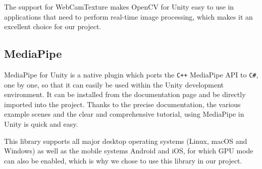 The support for WebCamTexture makes OpenCV for Unity easy to use in applications that need to perform real-time image processing,
which makes it an excellent choice for our project.

\subsection{MediaPipe}\label{subsec:mediapipe-for-unity}
MediaPipe for Unity is a native plugin which ports the \texttt{C++} MediaPipe API to \texttt{C\#}, one by one,
so that it can easily be used within the Unity development environment.
It can be installed from the documentation page and be directly imported into the project.
Thanks to the precise documentation, the various example scenes and the clear and comprehensive tutorial,
using MediaPipe in Unity is quick and easy.

This library supports all major desktop operating systems (Linux, macOS and Windows) as well as the mobile systems
Android and iOS, for which GPU mode can also be enabled, which is why we chose to use this library in our project.
